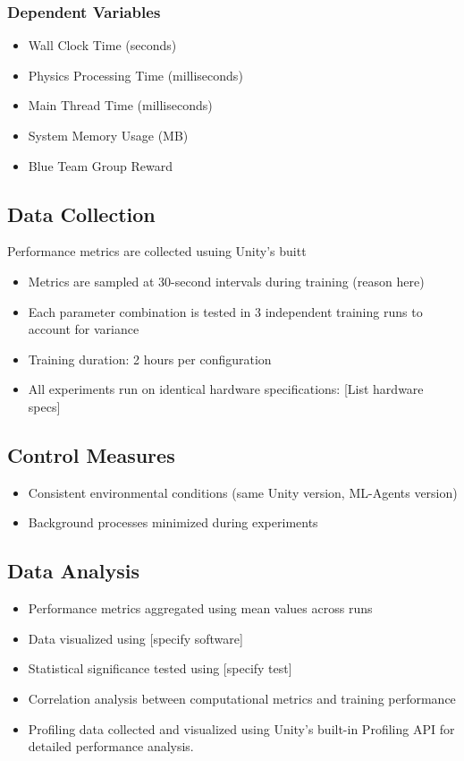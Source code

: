 \subsubsection{Dependent Variables}
\begin{itemize}
\item Wall Clock Time (seconds)
\item Physics Processing Time (milliseconds)
\item Main Thread Time (milliseconds)
\item System Memory Usage (MB)
\item Blue Team Group Reward 
\end{itemize}
\subsection{Data Collection}
Performance metrics are collected usuing Unity's buitt
\begin{itemize}
\item Metrics are sampled at 30-second intervals during training (reason here)
\item Each parameter combination is tested in 3 independent training runs to account for variance
\item Training duration: 2 hours per configuration
\item All experiments run on identical hardware specifications: [List hardware specs]
\end{itemize}
\subsection{Control Measures}
\begin{itemize}
\item Consistent environmental conditions (same Unity version, ML-Agents version)
\item Background processes minimized during experiments
\end{itemize}
\subsection{Data Analysis}
\begin{itemize}
\item Performance metrics aggregated using mean values across runs
\item Data visualized using [specify software]
\item Statistical significance tested using [specify test]
\item Correlation analysis between computational metrics and training performance
\item Profiling data collected and visualized using Unity's built-in Profiling API for detailed performance analysis.
\end{itemize}
